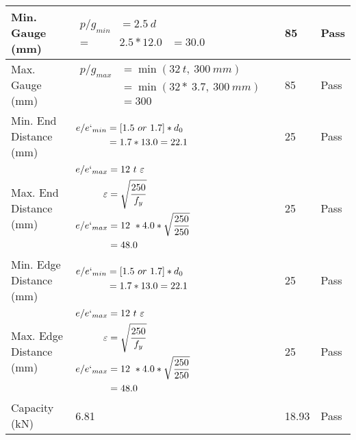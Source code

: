 \documentclass{article}%
\begin{document}
\begin{longtable}{|p{4cm}|p{5cm}|p{5.5cm}|p{1.5cm}|}
\hline%
Min. Gauge (mm)&$\begin{aligned}p/g_{min}&= 2.5 ~ d&\\ =&2.5*12.0&=30.0\end{aligned}$&85&Pass\\%
\hline%
Max. Gauge (mm)&$\begin{aligned}p/g_{max} &=\min(32~t,~300~mm)&\\ &=\min(32 *~3.7,~ 300 ~mm)\\&=300\end{aligned}$&85&Pass\\%
\hline%
Min. End Distance (mm)&$\begin{aligned}e/e`_{min} &=[1.5~or~ 1.7] * d_0\\ &=1.7*13.0=22.1 \end{aligned}$&25&Pass\\%
\hline%
Max. End Distance (mm)&$\begin{aligned}e/e`_{max} &= 12~ t~ \varepsilon&\\ \varepsilon &= \sqrt{\frac{250}{f_y}}\\ e/e`_{max}&=12 ~*4.0*\sqrt{\frac{250}{250}}\\ &=48.0\\ \end{aligned}$&25&Pass\\%
\hline%
Min. Edge Distance (mm)&$\begin{aligned}e/e`_{min} &=[1.5~or~ 1.7] * d_0\\ &=1.7*13.0=22.1 \end{aligned}$&25&Pass\\%
\hline%
Max. Edge Distance (mm)&$\begin{aligned}e/e`_{max} &= 12~ t~ \varepsilon&\\ \varepsilon &= \sqrt{\frac{250}{f_y}}\\ e/e`_{max}&=12 ~*4.0*\sqrt{\frac{250}{250}}\\ &=48.0\\ \end{aligned}$&25&Pass\\%
\hline%
Capacity (kN)&6.81&18.93&Pass\\%
\hline%
\end{longtable}

%
\newpage%
\end{document}
